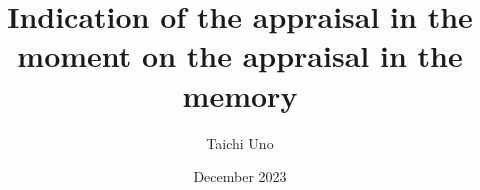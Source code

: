 \documentclass{article}
\title{Indication of the appraisal in the moment on the appraisal in the memory}
\author{Taichi Uno}
\date{December 2023}
\begin{document}
\maketitle

\begin{abstract}
\end{abstract}








\end{document}
